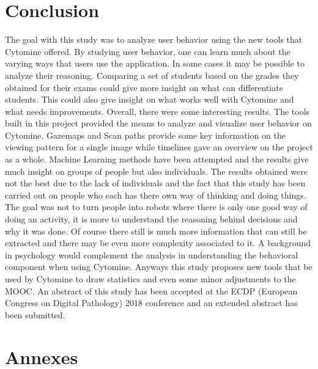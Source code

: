 \documentclass[a4paper,11pt]{report}
\numberwithin{figure}{chapter} %
\begin{document}
\chapter{Conclusion}

    The goal with this study was to analyze user behavior using the new tools that Cytomine offered.
    By studying user behavior, one can learn much about the varying ways that users use the application.
    In some cases it may be possible to analyze their reasoning.
    Comparing a set of students based on the grades they obtained for their exams could give more insight on what can differentiate students.
    This could also give insight on what works well with Cytomine and what needs improvements.
    Overall, there were some interesting results.
    The tools built in this project provided the means to analyze and visualize user behavior on Cytomine.
    Gazemaps and Scan paths provide some key information on the viewing pattern for a single image while timelines gave an overview on the project as a whole.
    Machine Learning methods have been attempted and the results give much insight on groups of people but also individuals.
    The results obtained were not the best due to the lack of individuals and the fact that this study has been carried out on people who each has there own way of thinking and doing things.
    The goal was not to turn people into robots where there is only one good way of doing an activity, it is more to understand the reasoning behind decisions and why it was done.
    Of course there still is much more information that can still be extracted and there may be even more complexity associated to it.
    A background in psychology would complement the analysis in understanding the behavioral component when using Cytomine.
    Anyways this study proposes new tools that be used by Cytomine to draw statistics and even some minor adjustments to the MOOC.
    An abstract of this study has been accepted at the ECDP (European Congress on Digital Pathology) 2018 conference and an extended abstract has been submitted.


{}



\chapter*{Annexes}
\end{document}
